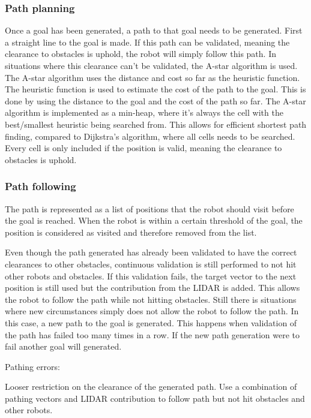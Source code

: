 \subsubsection{Path planning}\label{sec:path_planning}
Once a goal has been generated, a path to that goal needs to be generated. First a straight line to the goal is made. If this path can be validated, meaning the clearance to obstacles is uphold, the robot will simply follow this path.
In situations where this clearance can't be validated, the A-star algorithm is used.
The A-star algorithm uses the distance and cost so far as the heuristic function. The heuristic function is used to estimate the cost of the path to the goal. This is done by using the distance to the goal and the cost of the path so far.
The A-star algorithm is implemented as a min-heap, where it's always the cell with the best/smallest heuristic being searched from. This allows for efficient shortest path finding, compared to Dijkstra's algorithm, where all cells needs to be searched. Every cell is only included if the position is valid, meaning the clearance to obstacles is uphold.

\subsubsection{Path following}\label{sec:path_following}
The path is represented as a list of positions that the robot should visit before the goal is reached. When the robot is within a certain threshold of the goal, the position is considered as visited and therefore removed from the list.

Even though the path generated has already been validated to have the correct clearances to other obstacles, continuous validation is still performed to not hit other robots and obstacles.
If this validation fails, the target vector to the next position is still used but the contribution from the LIDAR is added. This allows the robot to follow the path while not hitting obstacles. 
Still there is situations where new circumstances simply does not allow the robot to follow the path. In this case, a new path to the goal is generated. This happens when validation of the path has failed too many times in a row. If the new path generation were to fail another goal will generated.

Pathing errors:

Looser restriction on the clearance of the generated path.
Use a combination of pathing vectors and LIDAR contribution to follow path but not hit obstacles and other robots.
